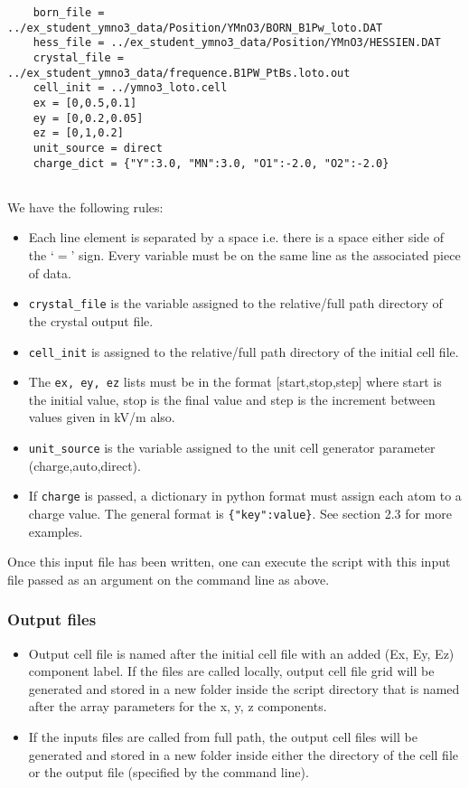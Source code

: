 \begin{lstlisting}
	born_file = ../ex_student_ymno3_data/Position/YMnO3/BORN_B1Pw_loto.DAT
	hess_file = ../ex_student_ymno3_data/Position/YMnO3/HESSIEN.DAT
	crystal_file = ../ex_student_ymno3_data/frequence.B1PW_PtBs.loto.out
	cell_init = ../ymno3_loto.cell
	ex = [0,0.5,0.1]
	ey = [0,0.2,0.05]
	ez = [0,1,0.2]
	unit_source = direct
	charge_dict = {"Y":3.0, "MN":3.0, "O1":-2.0, "O2":-2.0}
	
\end{lstlisting}

We have the following rules:

\begin{itemize}
	\item Each line element is separated by a space i.e. there is a space either side of the `$=$' sign. Every variable must be on the same line as the associated piece of data.
	
	\item \texttt{crystal\_file} is the variable assigned to the relative/full path directory of the crystal output file.
	
	\item \texttt{cell\_init} is assigned to the relative/full path directory of the initial cell file.
	
	\item The \texttt{ex, ey, ez} lists must be in the format [start,stop,step] where start is the initial value, stop is the final value and step is the increment between values given in kV/m also.
	
	\item \texttt{unit\_source} is the variable assigned to the unit cell generator parameter (charge,auto,direct).
	
	\item If \texttt{charge} is passed, a dictionary in python format must assign each atom to a charge value. The general format is \texttt{\{"key":value\}}. See section 2.3 for more examples.
	
\end{itemize}

Once this input file has been written, one can execute the script with this input file passed as an argument on the command line as above. 

\subsubsection{Output files}

\begin{itemize}
	\item Output cell file is named after the initial cell file with an added (Ex, Ey, Ez) component label. If the files are called locally, output cell file grid will be generated and stored in a new folder inside the script directory that is named after the array parameters for the x, y, z components.
	\item If the inputs files are called from full path, the output cell files will be generated and stored in a new folder inside either the directory of the cell file or the output file (specified by the command line).
\end{itemize}





